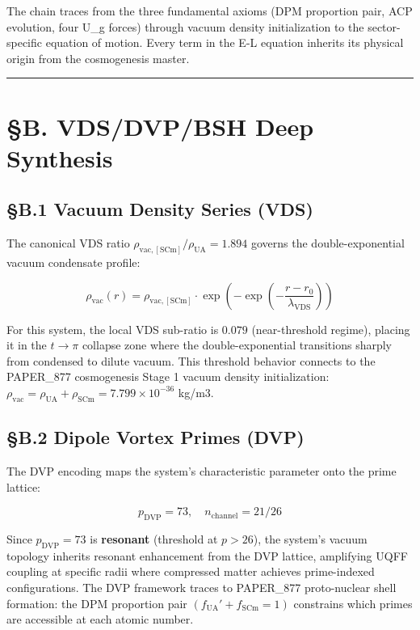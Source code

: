 \documentclass[12pt,a4paper]{article}
\begin{document}
The chain traces from the three fundamental axioms (DPM proportion pair, ACP evolution, four U\_g forces) through vacuum density initialization to the sector-specific equation of motion. Every term in the E-L equation inherits its physical origin from the cosmogenesis master.

\medskip\hrule\medskip

\section{\S{}B. VDS/DVP/BSH Deep Synthesis}

\subsection{\S{}B.1 Vacuum Density Series (VDS)}

The canonical VDS ratio $\rho_{\mathrm{vac,[SCm]}} / \rho_{\mathrm{UA}} = 1.894$ governs the double-exponential vacuum condensate profile:

\begin{equation}
\rho_{\mathrm{vac}}(r) = \rho_{\mathrm{vac,[SCm]}} \cdot \exp\!\left(-\exp\!\left(-\frac{r - r_0}{\lambda_{\mathrm{VDS}}}\right)\right)
\end{equation}

For this system, the local VDS sub-ratio is $0.079$ (near-threshold regime), placing it in the $t \to \pi$ collapse zone where the double-exponential transitions sharply from condensed to dilute vacuum. This threshold behavior connects to the PAPER\_877 cosmogenesis Stage 1 vacuum density initialization: $\rho_{\mathrm{vac}} = \rho_{\mathrm{UA}} + \rho_{\mathrm{SCm}} = 7.799 \times 10^{-36}$ kg/m3.

\subsection{\S{}B.2 Dipole Vortex Primes (DVP)}

The DVP encoding maps the system's characteristic parameter onto the prime lattice:

\begin{equation}
p_{\mathrm{DVP}} = 73, \quad n_{\mathrm{channel}} = 21/26
\end{equation}

Since $p_{\mathrm{DVP}} = 73$ is \textbf{resonant} (threshold at $p > 26$), the system's vacuum topology inherits resonant enhancement from the DVP lattice, amplifying UQFF coupling at specific radii where compressed matter achieves prime-indexed configurations. The DVP framework traces to PAPER\_877 proto-nuclear shell formation: the DPM proportion pair $(f_{\mathrm{UA}}' + f_{\mathrm{SCm}} = 1)$ constrains which primes are accessible at each atomic number.
\end{document}
